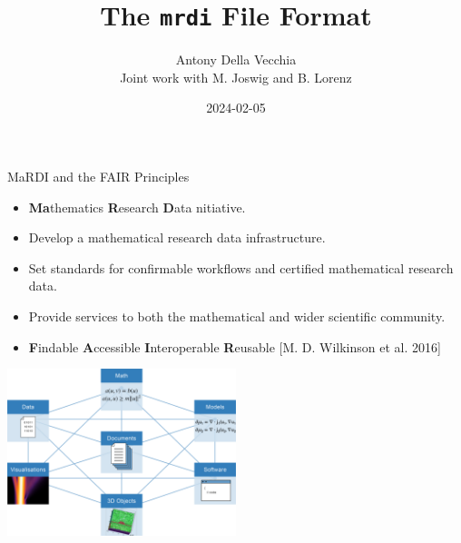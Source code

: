 \documentclass[9pt]{beamer}
\author[Antony Della Vecchia]{Antony Della Vecchia \\ \vspace{4mm} \small{Joint work with M. Joswig and B. Lorenz} }
\title{The \texttt{mrdi} File Format}
\institute[]{
Technische Universit\"at Berlin
}
\date{
  2024-02-05
}
\theoremstyle{definition}
\begin{document}
\maketitle


\begin{frame}[fragile]{MaRDI and the FAIR Principles}
  \begin{itemize}
  \item \textbf{Ma}thematics \textbf{R}esearch \textbf{D}ata nitiative.
  \item Develop a mathematical research data infrastructure.
  \item Set standards for confirmable workflows and certified mathematical research data.
  \item Provide services to both the mathematical and wider scientific community.
  \item \textbf{F}indable \textbf{A}ccessible \textbf{I}nteroperable \textbf{R}eusable [M. D. Wilkinson et al. 2016]

  \end{itemize}
  \begin{center}
    \includegraphics[width=0.5\textwidth, height=0.5\textheight]{images/graph}
  \end{center}
\end{frame}

\end{document}
